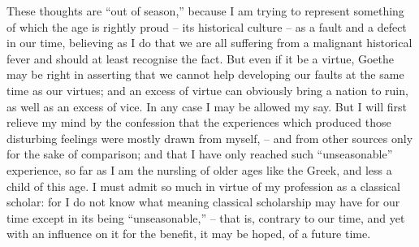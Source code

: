 These thoughts are \enquote{out of season,} because I am trying to represent
something of which the age is rightly proud -- its historical
culture -- as a fault and a defect in our time, believing as I do that
we are all suffering from a malignant historical fever and should at
least recognise the fact. But even if it be a virtue, Goethe may be
right in asserting that we cannot help developing our faults at the
same time as our virtues; and an excess of virtue can obviously bring
a nation to ruin, as well as an excess of vice. In any case I may be
allowed my say. But I will first relieve my mind by the confession
that the experiences which produced those disturbing feelings were
mostly drawn from myself, -- and from other sources only for the sake
of comparison; and that I have only reached such \enquote{unseasonable}
experience, so far as I am the nursling of older ages like the Greek,
and less a child of this age. I must admit so much in virtue of my
profession as a classical scholar: for I do not know what meaning
classical scholarship may have for our time except in its being
\enquote{unseasonable,} -- that is, contrary to our time, and yet with an
influence on it for the benefit, it may be hoped, of a future time.
